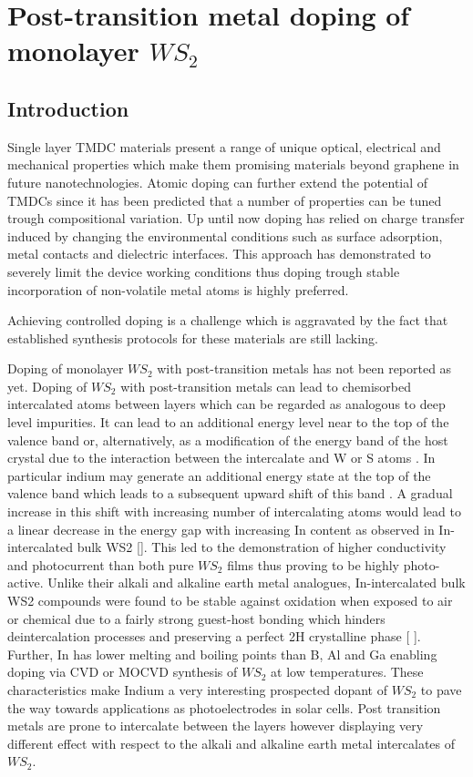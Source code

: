 \chapter{Post-transition metal doping of monolayer $WS_2$}

\section{Introduction}

Single layer TMDC materials present a range of unique optical, electrical and mechanical properties which make them promising materials beyond graphene in future nanotechnologies.
Atomic doping can further extend the potential of TMDCs since it has been predicted that a number of properties can be tuned trough compositional variation. Up until now doping has relied on charge transfer induced by changing the environmental conditions such as surface adsorption, metal contacts and dielectric interfaces. This approach has demonstrated to severely limit the device working conditions thus doping trough stable incorporation of non-volatile metal atoms is highly preferred.

Achieving controlled doping is a challenge which is aggravated by the fact that established synthesis protocols for these materials are still lacking.

Doping of monolayer $WS_2$ with post-transition metals has not been reported as yet. Doping of $WS_2$ with post-transition metals can lead to chemisorbed intercalated atoms between layers which can be regarded as analogous to deep level impurities. It can lead to an additional energy level near to the top of the valence band or, alternatively, as a modification of the energy band of the host crystal due to the interaction between the intercalate and W or S atoms \cite{Yacobi1979}\cite{Yacobi1979a}. In particular indium may generate an additional energy state at the top of the valence band which leads to a subsequent upward shift of this band \cite{Deshpande2001}. A gradual increase in this shift with increasing number of intercalating atoms would lead to a linear decrease in the energy gap with increasing In content as observed in In-intercalated bulk WS2 []. This led to the demonstration of higher conductivity and photocurrent than both pure $WS_2$ films thus proving to be highly photo-active. 
Unlike their alkali and alkaline earth metal analogues, In-intercalated bulk WS2 compounds were found to be stable against oxidation when exposed to air or chemical due to a fairly strong guest-host bonding which hinders deintercalation processes and preserving a perfect 2H crystalline phase [ ]. 
Further, In has lower melting and boiling points than B, Al and Ga enabling doping via CVD or MOCVD synthesis of $WS_2$ at low temperatures.
These characteristics make Indium a very interesting prospected dopant of $WS_2$ to pave the way towards applications as photoelectrodes in solar cells.
Post transition metals are prone to intercalate between the layers however displaying very different effect with respect to the alkali and alkaline earth metal intercalates of $WS_2$.

